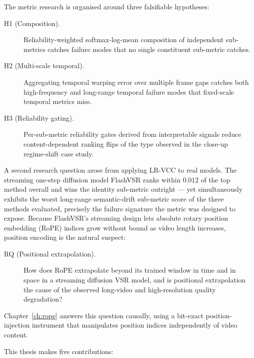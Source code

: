 The metric research is organised around three falsifiable hypotheses:

\begin{description}
    \item[H1 (Composition).] Reliability-weighted softmax-log-mean composition of
        independent sub-metrics catches failure modes that no single constituent
        sub-metric catches.
    \item[H2 (Multi-scale temporal).] Aggregating temporal warping error over multiple
        frame gaps catches both high-frequency and long-range temporal failure modes that
        fixed-scale temporal metrics miss.
    \item[H3 (Reliability gating).] Per-sub-metric reliability gates derived from
        interpretable signals reduce content-dependent ranking flips of the type observed
        in the close-up regime-shift case study.
\end{description}

A second research question arose from applying LR-VCC to real models. The streaming
one-step diffusion model FlashVSR ranks within $0.012$ of the top method overall and
wins the identity sub-metric outright --- yet simultaneously exhibits the worst
long-range semantic-drift sub-metric score of the three methods evaluated, precisely
the failure signature the metric was designed to expose. Because
FlashVSR's streaming design lets absolute rotary position embedding (RoPE) indices grow
without bound as video length increases, position encoding is the natural suspect:

\begin{description}
    \item[RQ (Positional extrapolation).] How does RoPE extrapolate beyond its trained
        window in time and in space in a streaming diffusion VSR model, and is positional
        extrapolation the cause of the observed long-video and high-resolution quality
        degradation?
\end{description}

Chapter~\ref{ch:rope} answers this question causally, using a bit-exact position-injection
instrument that manipulates position indices independently of video content.

This thesis makes five contributions:


